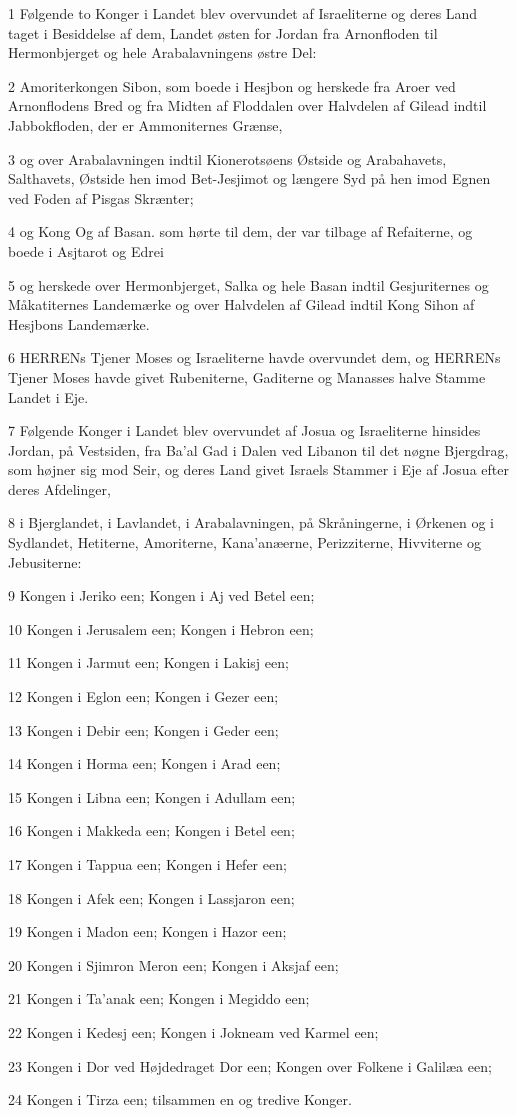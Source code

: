 \par 1 Følgende to Konger i Landet blev overvundet af Israeliterne og deres Land taget i Besiddelse af dem, Landet østen for Jordan fra Arnonfloden til Hermonbjerget og hele Arabalavningens østre Del:
\par 2 Amoriterkongen Sibon, som boede i Hesjbon og herskede fra Aroer ved Arnonflodens Bred og fra Midten af Floddalen over Halvdelen af Gilead indtil Jabbokfloden, der er Ammoniternes Grænse,
\par 3 og over Arabalavningen indtil Kionerotsøens Østside og Arabahavets, Salthavets, Østside hen imod Bet-Jesjimot og længere Syd på hen imod Egnen ved Foden af Pisgas Skrænter;
\par 4 og Kong Og af Basan. som hørte til dem, der var tilbage af Refaiterne, og boede i Asjtarot og Edrei
\par 5 og herskede over Hermonbjerget, Salka og hele Basan indtil Gesjuriternes og Måkatiternes Landemærke og over Halvdelen af Gilead indtil Kong Sihon af Hesjbons Landemærke.
\par 6 HERRENs Tjener Moses og Israeliterne havde overvundet dem, og HERRENs Tjener Moses havde givet Rubeniterne, Gaditerne og Manasses halve Stamme Landet i Eje.
\par 7 Følgende Konger i Landet blev overvundet af Josua og Israeliterne hinsides Jordan, på Vestsiden, fra Ba'al Gad i Dalen ved Libanon til det nøgne Bjergdrag, som højner sig mod Seir, og deres Land givet Israels Stammer i Eje af Josua efter deres Afdelinger,
\par 8 i Bjerglandet, i Lavlandet, i Arabalavningen, på Skråningerne, i Ørkenen og i Sydlandet, Hetiterne, Amoriterne, Kana'anæerne, Perizziterne, Hivviterne og Jebusiterne:
\par 9 Kongen i Jeriko een; Kongen i Aj ved Betel een;
\par 10 Kongen i Jerusalem een; Kongen i Hebron een;
\par 11 Kongen i Jarmut een; Kongen i Lakisj een;
\par 12 Kongen i Eglon een; Kongen i Gezer een;
\par 13 Kongen i Debir een; Kongen i Geder een;
\par 14 Kongen i Horma een; Kongen i Arad een;
\par 15 Kongen i Libna een; Kongen i Adullam een;
\par 16 Kongen i Makkeda een; Kongen i Betel een;
\par 17 Kongen i Tappua een; Kongen i Hefer een;
\par 18 Kongen i Afek een; Kongen i Lassjaron een;
\par 19 Kongen i Madon een; Kongen i Hazor een;
\par 20 Kongen i Sjimron Meron een; Kongen i Aksjaf een;
\par 21 Kongen i Ta'anak een; Kongen i Megiddo een;
\par 22 Kongen i Kedesj een; Kongen i Jokneam ved Karmel een;
\par 23 Kongen i Dor ved Højdedraget Dor een; Kongen over Folkene i Galilæa een;
\par 24 Kongen i Tirza een; tilsammen en og tredive Konger.

